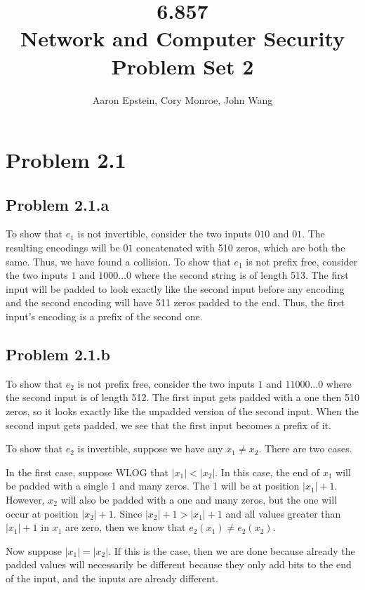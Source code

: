 \documentclass[psamsfonts]{amsart}
\title{6.857 \\
Network and Computer Security \\
Problem Set 2}
\author{Aaron Epstein, Cory Monroe, John Wang}
\begin{document}
\maketitle

\section{Problem 2.1}

\subsection{Problem 2.1.a}

To show that $e_1$ is not invertible, consider the two inputs $010$ and $01$. The resulting encodings will be $01$ concatenated with 510 zeros, which are both the same. Thus, we have found a collision. To show that $e_1$ is not prefix free, consider the two inputs $1$ and $1000\ldots0$ where the second string is of length 513. The first input will be padded to look exactly like the second input before any encoding and the second encoding will have 511 zeros padded to the end. Thus, the first input's encoding is a prefix of the second one.

\subsection{Problem 2.1.b}

To show that $e_2$ is not prefix free, consider the two inputs $1$ and $11000\ldots0$ where the second input is of length 512. The first input gets padded with a one then 510 zeros, so it looks exactly like the unpadded version of the second input. When the second input gets padded, we see that the first input becomes a prefix of it.

To show that $e_2$ is invertible, suppose we have any $x_1 \neq x_2$. There are two cases.

In the first case, suppose WLOG that $|x_1| < |x_2|$. In this case, the end of $x_1$ will be padded with a single 1 and many zeros. The 1 will be at position $|x_1| + 1$. However, $x_2$ will also be padded with a one and many zeros, but the one will occur at position $|x_2| + 1$. Since $|x_2| + 1 > |x_1| + 1$ and all values greater than $|x_1| + 1$ in $x_1$ are zero, then we know that $e_2(x_1) \neq e_2(x_2)$. 

Now suppose $|x_1| = |x_2|$. If this is the case, then we are done because already the padded values will necessarily be different because they only add bits to the end of the input, and the inputs are already different.
\end{document}
